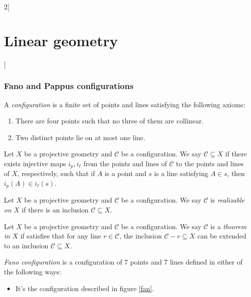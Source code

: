 \documentclass[../../../main.tex]{subfiles}
\begin{document}
\begin{multicols}{2}[\section{Linear geometry}]
    \subsubsection*{Fano and Pappus configurations}
    \begin{definition}
        A \textit{configuration} is a finite set of points and lines satisfying the following axioms:
        \begin{enumerate}
            \item There are four points such that no three of them are collinear.
            \item Two distinct points lie on at most one line.
        \end{enumerate}
    \end{definition}
    \begin{definition}
        Let $X$ be a projective geometry and $\mathcal{C}$ be a configuration. We say $\mathcal{C}\subseteq X$ if there exists injective maps $i_p,i_\ell$ from the points and lines of $\mathcal{C}$ to the points and lines of $X$, respectively, such that if $A$ is a point and $s$ is a line satisfying $A\in s$, then $i_p(A)\in i_\ell(s)$.
    \end{definition}
    \begin{definition}
        Let $X$ be a projective geometry and $\mathcal{C}$ be a configuration. We say $\mathcal{C}$ is \textit{realizable on $X$} if there is an inclusion $\mathcal{C}\subseteq X$.
    \end{definition}
    \begin{definition}
        Let $X$ be a projective geometry and $\mathcal{C}$ be a configuration. We say $\mathcal{C}$ is a \textit{theorem in $X$} if satisfies that for any line $r\in\mathcal{C}$, the inclusion $\mathcal{C}-r\subseteq X$ can be extended to an inclusion $\mathcal{C}\subseteq X$.
    \end{definition}
    \begin{definition}
        \textit{Fano configuration} is a configuration of 7 points and 7 lines defined in either of the following ways:
        \begin{itemize}
            \item It's the configuration described in figure \ref{fan}.
                  \begin{center}
                      \begin{minipage}{\linewidth}
                          \centering
                          

\end{minipage}
\end{center}
\end{itemize}
\end{definition}
\end{multicols}
\end{document}
